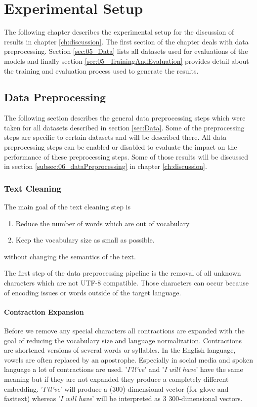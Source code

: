 \chapter{Experimental Setup}
\label{ch:setup}

The following chapter describes the experimental setup for the discussion of results in chapter \ref{ch:discussion}. The first section of the chapter deals with data preprocessing. Section \ref{sec:05_Data} lists all datasets used for evaluations of the models and finally section \ref{sec:05_TrainingAndEvaluation} provides detail about the training and evaluation process used to generate the results.

\section{Data Preprocessing}
The following section describes the general data preprocessing steps which were taken for all datasets described in section \ref{sec:Data}. Some of the preprocessing steps are specific to certain datasets and will be described there. All data preprocessing steps can be enabled or disabled to evaluate the impact on the performance of these preprocessing steps. Some of those results will be discussed in section \ref{subsec:06_dataPreprocessing} in chapter \ref{ch:discussion}.

\subsection{Text Cleaning}
The main goal of the text cleaning step is 
\begin{enumerate}
	\item Reduce the number of words which are out of vocabulary
	\item Keep the vocabulary size as small as possible.
\end{enumerate}

without changing the semantics of the text.


The first step of the data preprocessing pipeline is the removal of all unknown characters which are not UTF-8 compatible. Those characters can occur because of encoding issues or words outside of the target language. 
\subsubsection*{Contraction Expansion}

Before we remove any special characters all contractions are expanded with the goal of reducing the vocabulary size and language normalization. Contractions are shortened versions of several words or syllables. In the English language, vowels are often replaced by an apostrophe.  Especially in social media and spoken language a lot of contractions are used. '\textit{I'll've}' and '\textit{I will have}' have the same meaning but if they are not expanded they produce a completely different embedding. '\textit{I'll've}' will produce a (300)-dimensional vector (for glove and fasttext) whereas '\textit{I will have}' will be interpreted as 3 300-dimensional vectors.
\medskip

